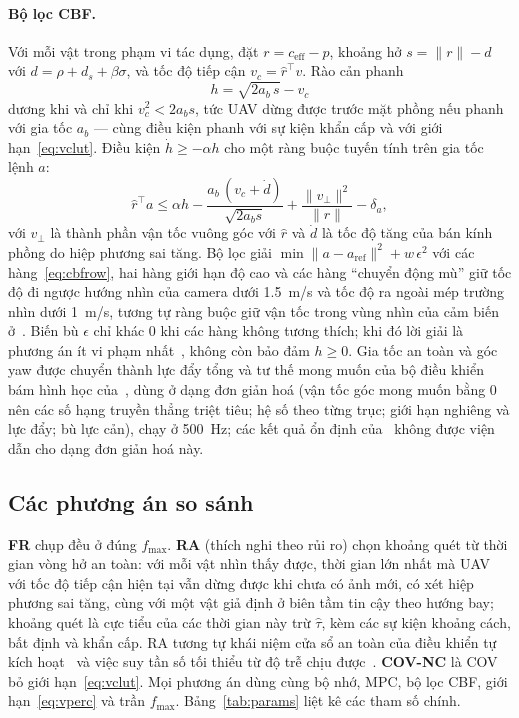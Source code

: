 \documentclass[11pt,a4paper]{article}
\theoremstyle{plain}
\theoremstyle{definition}
\theoremstyle{remark}
\newcommand{\fmax}{f_{\max}}
\newcommand{\tauh}{\hat{\tau}}
\begin{document}
\paragraph{Bộ lọc CBF.} Với mỗi vật trong phạm vi tác dụng, đặt $r = c_{\mathrm{eff}} - p$, khoảng hở $s = \|r\| - d$ với $d = \rho + d_s + \beta\sigma$, và tốc độ tiếp cận $v_c = \hat r^\top v$. Rào cản phanh~\cite{wang2017}
\begin{equation}\label{eq:hbrake}
h = \sqrt{2a_b\,s} - v_c
\end{equation}
dương khi và chỉ khi $v_c^2 < 2a_b s$, tức UAV dừng được trước mặt phồng nếu phanh với gia tốc $a_b$ --- cùng điều kiện phanh với sự kiện khẩn cấp và với giới hạn~\eqref{eq:vclut}. Điều kiện $\dot h \ge -\alpha h$ cho một ràng buộc tuyến tính trên gia tốc lệnh $a$:
\begin{equation}\label{eq:cbfrow}
\hat r^\top a \le \alpha h - \frac{a_b\,(v_c + \dot d)}{\sqrt{2a_b s}} + \frac{\|v_\perp\|^2}{\|r\|} - \delta_a,
\end{equation}
với $v_\perp$ là thành phần vận tốc vuông góc với $\hat r$ và $\dot d$ là tốc độ tăng của bán kính phồng do hiệp phương sai tăng. Bộ lọc giải $\min\|a - a_{\mathrm{ref}}\|^2 + w\,\epsilon^2$ với các hàng~\eqref{eq:cbfrow}, hai hàng giới hạn độ cao và các hàng ``chuyển động mù'' giữ tốc độ đi ngược hướng nhìn của camera dưới 1.5~m/s và tốc độ ra ngoài mép trường nhìn dưới 1~m/s, tương tự ràng buộc giữ vận tốc trong vùng nhìn của cảm biến ở~\cite{misyats2025}. Biến bù $\epsilon$ chỉ khác 0 khi các hàng không tương thích; khi đó lời giải là phương án ít vi phạm nhất~\cite{yaghoubi2021}, không còn bảo đảm $h \ge 0$. Gia tốc an toàn và góc yaw được chuyển thành lực đẩy tổng và tư thế mong muốn của bộ điều khiển bám hình học của~\cite{lee2010}, dùng ở dạng đơn giản hoá (vận tốc góc mong muốn bằng 0 nên các số hạng truyền thẳng triệt tiêu; hệ số theo từng trục; giới hạn nghiêng và lực đẩy; bù lực cản), chạy ở 500~Hz; các kết quả ổn định của~\cite{lee2010} không được viện dẫn cho dạng đơn giản hoá này.

\subsection{Các phương án so sánh}\label{sec:baselines}

\textbf{FR} chụp đều ở đúng $\fmax$. \textbf{RA} (thích nghi theo rủi ro) chọn khoảng quét từ thời gian vòng hở an toàn: với mỗi vật nhìn thấy được, thời gian lớn nhất mà UAV với tốc độ tiếp cận hiện tại vẫn dừng được khi chưa có ảnh mới, có xét hiệp phương sai tăng, cùng với một vật giả định ở biên tầm tin cậy theo hướng bay; khoảng quét là cực tiểu của các thời gian này trừ $\tauh$, kèm các sự kiện khoảng cách, bất định và khẩn cấp. RA tương tự khái niệm cửa sổ an toàn của điều khiển tự kích hoạt~\cite{yang2019} và việc suy tần số tối thiểu từ độ trễ chịu được~\cite{hsiao2022}. \textbf{COV-NC} là COV bỏ giới hạn~\eqref{eq:vclut}. Mọi phương án dùng cùng bộ nhớ, MPC, bộ lọc CBF, giới hạn~\eqref{eq:vperc} và trần $\fmax$. Bảng~\ref{tab:params} liệt kê các tham số chính.
\end{document}
